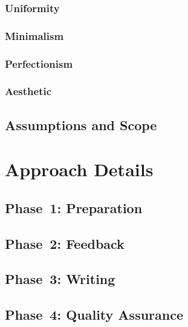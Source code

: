 \documentclass[a4paper]{memoir}
\begin{document}
\subsection{Uniformity}
\label{sec:uniformity}

\subsection{Minimalism}
\label{sec:minimalism}

\subsection{Perfectionism}
\label{sec:perfectionism}

\subsection{Aesthetic}
\label{sec:aestethic}

\section{Assumptions and Scope}
\label{sec:assumptions-scope}


\chapter{Approach Details}
\label{cha:details}

\section{Phase~1: Preparation}
\label{sec:preparation}

\section{Phase~2: Feedback}
\label{sec:feedback}

\section{Phase~3: Writing}
\label{sec:writing}

\section{Phase~4: Quality Assurance}
\label{sec:quality}

\end{document}
